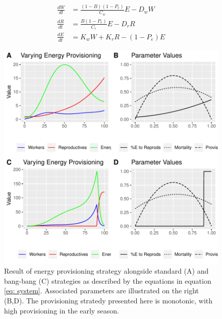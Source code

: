 \documentclass[12pt]{report}
\begin{document}
\begin{equation}
\begin{aligned}
\frac{dW}{dt}&=\frac{(1-B)(1-P_e)}{C_w}E-D_w W\\
\frac{dR}{dt}&=\frac{B(1-P_e)}{C_r}E-D_r R\\
\frac{dE}{dt}&=K_w W + K_r R - (1-P_e)E
\end{aligned}
\label{eq: energy system}
\end{equation}



\begin{figure}[t]
\centering
\includegraphics{SweaveDoc-temp}
\caption{Result of energy provisioning strategy alongside standard (A) and bang-bang (C) strategies as described by the equations in equation \ref{eq: system}. Associated parameters are illustrated on the right (B,D). The provisioning stratedy presented here is monotonic, with high provisioning in the early season. }
\end{figure}


\newpage



\end{document}
